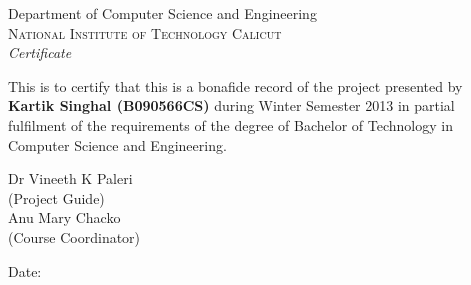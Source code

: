 \newpage
\thispagestyle{empty}

\begin{center}

\huge{Department of Computer Science and Engineering}\\[0.5cm]
\normalsize
\textsc{National Institute of Technology Calicut}\\[2.0cm]

\emph{\LARGE Certificate}\\[2.5cm]
\end{center}
\normalsize This is to certify that this is a bonafide record of the project presented by \textbf {Kartik Singhal (B090566CS)} during Winter Semester 2013 in partial fulfilment of the requirements of the degree of Bachelor of Technology in Computer Science and Engineering.\\[2.0in]



\begin{flushright}
Dr Vineeth K Paleri\\
(Project Guide)\\[2.0cm]
Anu Mary Chacko\\
(Course Coordinator)\\
\end{flushright}

\begin{flushleft}
Date:
\end{flushleft}
